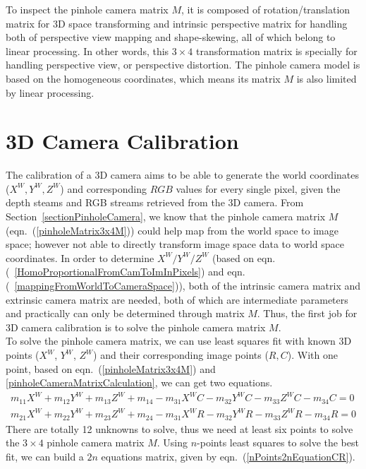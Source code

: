 To inspect the pinhole camera matrix \(M\), it is composed of rotation/translation matrix for 3D space transforming and intrinsic perspective matrix for handling both of perspective view mapping and shape-skewing, all of which belong to linear processing. In other words, this $3\times4$ transformation matrix is specially for handling perspective view, or perspective distortion. The pinhole camera model is based on the homogeneous coordinates, which means its matrix \(M\) is also limited by linear processing.
   
\section{3D Camera Calibration}
\label{section3DcameraCalibration}
\indent
The calibration of a 3D camera aims to be able to generate the world coordinates (\(X^W, Y^W, Z^W\)) and corresponding \(RGB\) values for every single pixel, given the depth steams and RGB streams retrieved from the 3D camera. From Section~\ref{sectionPinholeCamera}, we know that the pinhole camera matrix \(M\) (eqn.~(\ref{pinholeMatrix3x4M})) could help map from the world space to image space; however not able to directly transform image space data to world space coordinates. In order to determine \(X^W/Y^W/Z^W\) (based on eqn.(~\ref{HomoProportionalFromCamToImInPixels}) and eqn.(~\ref{mappingFromWorldToCameraSpace})), both of the intrinsic camera matrix and extrinsic camera matrix are needed, both of which are intermediate parameters and practically can only be determined through matrix \(M\). Thus, the first job for 3D camera calibration is to solve the pinhole camera matrix \(M\).
\\\indent
To solve the pinhole camera matrix, we can use least squares fit with known 3D points (\(X^W\), \(Y^W\), \(Z^W\)) and their corresponding image points (\(R, C\)). With one point, based on eqn.~(\ref{pinholeMatrix3x4M}) and \ref{pinholeCameraMatrixCalculation}, we can get two equations.
\begin{equation}
\begin{aligned}
m_{11}X^W + m_{12}Y^W + m_{13}Z^W + m_{14} - m_{31}X^WC - m_{32}Y^WC - m_{33}Z^WC - m_{34}C = 0%
\\%
m_{21}X^W + m_{22}Y^W + m_{23}Z^W + m_{24} - m_{31}X^WR - m_{32}Y^WR - m_{33}Z^WR - m_{34}R = 0
\end{aligned}
\label{onePointEquationCR}
\end{equation}%
\noindent
There are totally 12 unknowns to solve, thus we need at least six points to solve the $3\times4$ pinhole camera matrix \(M\). Using $n$-points least squares to solve the best fit, we can build a $2n$ equations matrix, given by eqn.~(\ref{nPoints2nEquationCR}).

